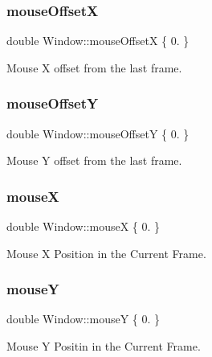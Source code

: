 \subsubsection{\texorpdfstring{mouse\+OffsetX}{mouseOffsetX}}
{\footnotesize\ttfamily double Window\+::mouse\+OffsetX \{ 0. \}}



Mouse X offset from the last frame. 

\mbox{\label{class_window_a22d84e6f9e9c7e283f303798b630c733}} 
\subsubsection{\texorpdfstring{mouse\+OffsetY}{mouseOffsetY}}
{\footnotesize\ttfamily double Window\+::mouse\+OffsetY \{ 0. \}}



Mouse Y offset from the last frame. 

\mbox{\label{class_window_a68f752a9e5c04cf32a50b169df0de609}} 
\subsubsection{\texorpdfstring{mouseX}{mouseX}}
{\footnotesize\ttfamily double Window\+::mouseX \{ 0. \}}



Mouse X Position in the Current Frame. 

\mbox{\label{class_window_a9f5f64a77451ba45212dab398f7b9dac}} 
\subsubsection{\texorpdfstring{mouseY}{mouseY}}
{\footnotesize\ttfamily double Window\+::mouseY \{ 0. \}}



Mouse Y Positin in the Current Frame. 

\mbox{\label{class_window_aa0adc9c4e183ccaa355928059359fe9a}} 
